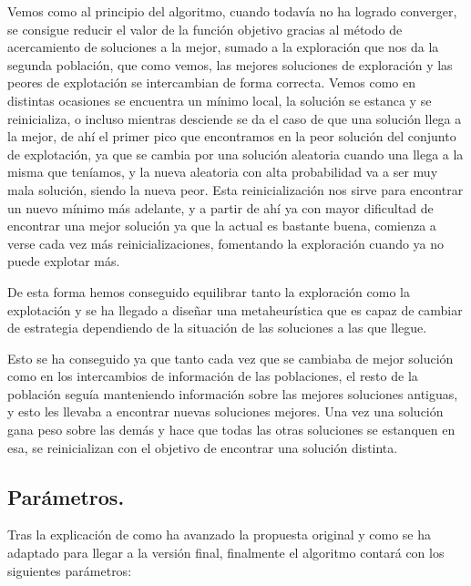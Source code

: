 \documentclass[12pt, spanish]{article}
\begin{document}
Vemos como al principio del algoritmo, cuando todavía no ha logrado converger, se consigue reducir el valor de la función objetivo gracias al método de acercamiento de soluciones a la mejor, sumado a la exploración que nos da la segunda población, que como vemos, las mejores soluciones de exploración y las peores de explotación se intercambian de forma correcta. Vemos como en distintas ocasiones se encuentra un mínimo local, la solución se estanca y se reinicializa, o incluso mientras desciende se da el caso de que una solución llega a la mejor, de ahí el primer pico que encontramos en la peor solución del conjunto de explotación, ya que se cambia por una solución aleatoria cuando una llega a la misma que teníamos, y la nueva aleatoria con alta probabilidad va a ser muy mala solución, siendo la nueva peor. Esta reinicialización nos sirve para encontrar un nuevo mínimo más adelante, y a partir de ahí ya con mayor dificultad de encontrar una mejor solución ya que la actual es bastante buena, comienza a verse cada vez más reinicializaciones, fomentando la exploración cuando ya no puede explotar más.

De esta forma hemos conseguido equilibrar tanto la exploración como la explotación y se ha llegado a diseñar una metaheurística que es capaz de cambiar de estrategia dependiendo de la situación de las soluciones a las que llegue.

Esto se ha conseguido ya que tanto cada vez que se cambiaba de mejor solución como en los intercambios de información de las poblaciones, el resto de la población seguía manteniendo información sobre las mejores soluciones antiguas, y esto les llevaba a encontrar nuevas soluciones mejores. Una vez una solución gana peso sobre las demás y hace que todas las otras soluciones se estanquen en esa, se reinicializan con el objetivo de encontrar una solución distinta.


\subsection{Parámetros.}

Tras la explicación de como ha avanzado la propuesta original y como se ha adaptado para llegar a la versión final, finalmente el algoritmo contará con los siguientes parámetros:
\end{document}
